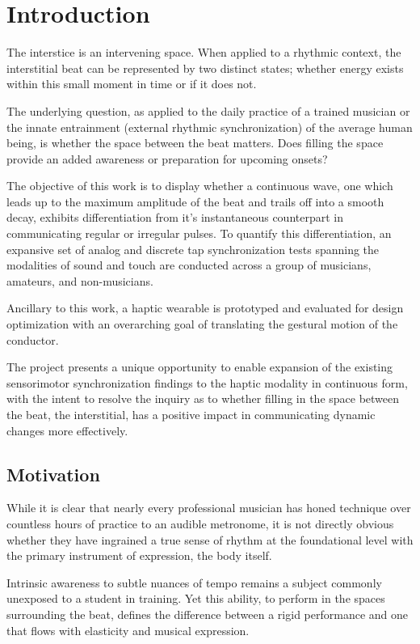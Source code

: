 
\chapter{Introduction} \label{secIntro}
The interstice is an intervening space. When applied to a rhythmic context, the interstitial beat can be represented by two distinct states; whether energy exists within this small moment in time or if it does not. 

The underlying question, as applied to the daily practice of a trained musician or the innate entrainment (external rhythmic synchronization) of the average human being, is whether the space between the beat matters. Does filling the space provide an added awareness or preparation for upcoming onsets?

The objective of this work is to display whether a continuous wave, one which leads up to the maximum amplitude of the beat and trails off into a smooth decay, exhibits differentiation from it's instantaneous counterpart in communicating regular or irregular pulses. To quantify this differentiation, an expansive set of analog and discrete tap synchronization tests spanning the modalities of sound and touch are conducted across a group of musicians, amateurs, and non-musicians.

Ancillary to this work, a haptic wearable is prototyped and evaluated for design optimization with an overarching goal of translating the gestural motion of the conductor.

The project presents a unique opportunity to enable expansion of the existing sensorimotor synchronization findings to the haptic modality in continuous form, with the intent to resolve the inquiry as to whether filling in the space between the beat, the interstitial, has a positive impact in communicating dynamic changes more effectively.

\section{Motivation}
While it is clear that nearly every professional musician has honed technique over countless hours of practice to an audible metronome, it is not directly obvious whether they have ingrained a true sense of rhythm at the foundational level with the primary instrument of expression, the body itself.

Intrinsic awareness to subtle nuances of tempo remains a subject commonly unexposed to a student in training. Yet this ability, to perform in the spaces surrounding the beat, defines the difference between a rigid performance and one that flows with elasticity and musical expression.

